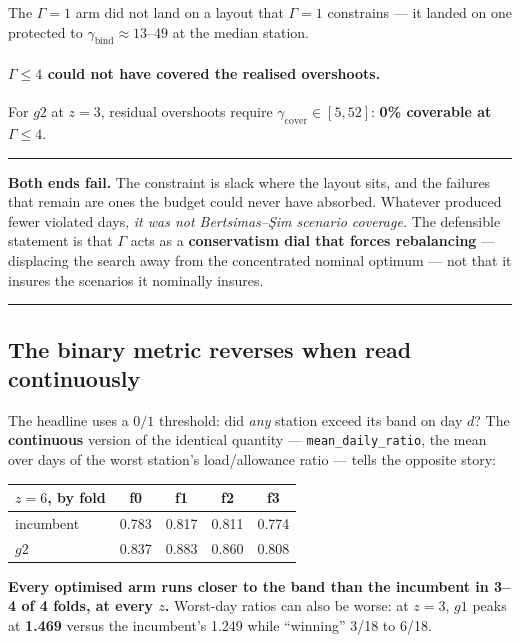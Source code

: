 \documentclass[11pt,a4paper]{article}
\newenvironment{keybox}
  {\par\medskip\noindent\rule{\linewidth}{0.9pt}\par\nobreak\smallskip\ignorespaces}
  {\par\smallskip\nobreak\noindent\rule{\linewidth}{0.9pt}\par\medskip}
\newcommand{\gbind}{\gamma_{\mathrm{bind}}}
\newcommand{\gcover}{\gamma_{\mathrm{cover}}}
\begin{document}
The $\Gamma=1$ arm did not land on a layout that $\Gamma=1$ constrains --- it
landed on one protected to $\gbind\approx13$--$49$ at the median station.

\paragraph{$\Gamma\le4$ could not have covered the realised overshoots.}
For $g2$ at $z=3$, residual overshoots require $\gcover\in[5,52]$:
\textbf{0\% coverable at $\Gamma\le4$}.

\begin{keybox}
\textbf{Both ends fail.} The constraint is slack where the layout sits, and the
failures that remain are ones the budget could never have absorbed. Whatever
produced fewer violated days, \emph{it was not Bertsimas--\c{S}im scenario
coverage.} The defensible statement is that $\Gamma$ acts as a
\textbf{conservatism dial that forces rebalancing} --- displacing the search
away from the concentrated nominal optimum --- not that it insures the
scenarios it nominally insures.
\end{keybox}

\subsection{The binary metric reverses when read continuously}

The headline uses a $0/1$ threshold: did \emph{any} station exceed its band on
day $d$? The \textbf{continuous} version of the identical quantity ---
\texttt{mean\_daily\_ratio}, the mean over days of the worst station's
load/allowance ratio --- tells the opposite story:

\begin{center}
\begin{tabular}{lcccc}
\toprule
$z=6$, by fold & f0 & f1 & f2 & f3 \\
\midrule
incumbent & 0.783 & 0.817 & 0.811 & 0.774 \\
$g2$      & 0.837 & 0.883 & 0.860 & 0.808 \\
\bottomrule
\end{tabular}
\end{center}

\textbf{Every optimised arm runs closer to the band than the incumbent in 3--4
of 4 folds, at every $z$.} Worst-day ratios can also be worse: at $z=3$, $g1$
peaks at \textbf{1.469} versus the incumbent's 1.249 while ``winning'' 3/18 to
6/18.
\end{document}
